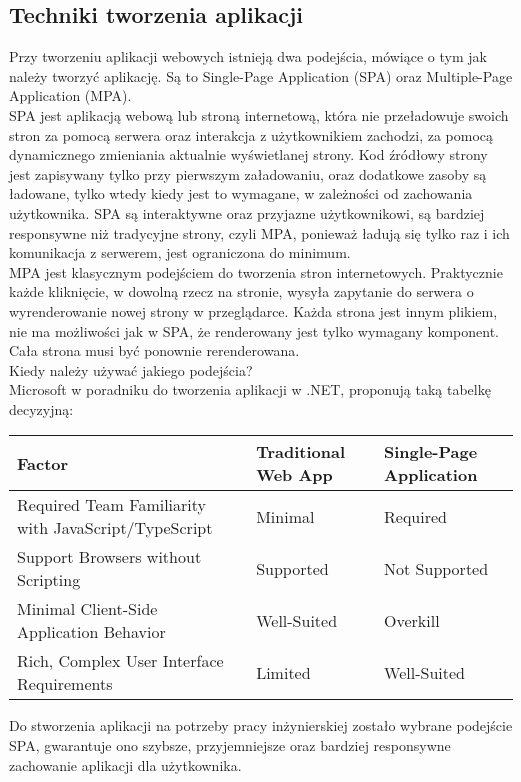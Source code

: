 \documentclass[12pt]{article}
\begin{document}
\begin{sloppypar}
{\subsection{Techniki tworzenia aplikacji}
{
  Przy tworzeniu aplikacji webowych istnieją dwa podejścia, mówiące o tym jak należy tworzyć aplikację. 
  Są to Single-Page Application (SPA) oraz Multiple-Page Application (MPA). \\
  SPA jest aplikacją webową lub stroną internetową, która nie przeładowuje swoich stron za pomocą serwera oraz interakcja z użytkownikiem zachodzi, 
  za pomocą dynamicznego zmieniania aktualnie wyświetlanej strony. Kod źródłowy strony jest zapisywany tylko przy pierwszym załadowaniu, oraz 
  dodatkowe zasoby są ładowane, tylko wtedy kiedy jest to wymagane, w zależności od zachowania użytkownika. 
  SPA są interaktywne oraz przyjazne użytkownikowi, są bardziej responsywne niż tradycyjne strony, czyli MPA, ponieważ ładują się tylko raz i ich komunikacja z serwerem,
  jest ograniczona do minimum. \cite{spa-conference} \\
  MPA jest klasycznym podejściem do tworzenia stron internetowych. 
  Praktycznie każde kliknięcie, w dowolną rzecz na stronie, wysyła zapytanie do serwera o wyrenderowanie nowej strony w przeglądarce.
  Każda strona jest innym plikiem, nie ma możliwości jak w SPA, że renderowany jest tylko wymagany komponent. Cała strona musi być ponownie rerenderowana. \\
  Kiedy należy używać jakiego podejścia? \\
  Microsoft w poradniku do tworzenia aplikacji w .NET, proponują taką tabelkę decyzyjną\cite{mc-spa}:
  \begin{center}
    \begin{tabular}{ | m{5cm} | m{5cm}| m{5cm} | } 
      \hline
      Factor & Traditional Web App & Single-Page Application \\
      \hline
      Required Team Familiarity with JavaScript/TypeScript & Minimal & Required \\
      \hline
      Support Browsers without Scripting & Supported & Not Supported \\
      \hline
      Minimal Client-Side Application Behavior & Well-Suited & Overkill \\
      \hline
      Rich, Complex User Interface Requirements & Limited & Well-Suited \\
      \hline
    \end{tabular}
  \end{center}
  Do stworzenia aplikacji na potrzeby pracy inżynierskiej zostało wybrane podejście SPA, gwarantuje ono szybsze, przyjemniejsze oraz bardziej responsywne 
  zachowanie aplikacji dla użytkownika.
}
}
\end{sloppypar}
\end{document}
